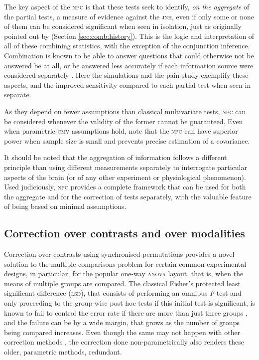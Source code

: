 The key aspect of the \textsc{npc} is that these tests seek to identify, \emph{on the aggregate} of the partial tests, a measure of evidence against the \textsc{jnh}, even if only some or none of them can be considered significant when seen in isolation, just as originally pointed out by \citet{Fisher1932} (Section \ref{sec:comb:history}). This is the logic and interpretation of all of these combining statistics, with the exception of the conjunction inference. Combination is known to be able to answer questions that could otherwise not be answered be at all, or be answered less accurately if each information source were considered separately \citep{Draper1992}. Here the simulations and the pain study exemplify these aspects, and the improved sensitivity compared to each partial test when seen in separate.

As they depend on fewer assumptions than classical multivariate tests, \textsc{npc} can be considered whenever the validity of the former cannot be guaranteed. Even when parametric \textsc{cmv} assumptions hold, note that the \textsc{npc} can have superior power when sample size is small and prevents precise estimation of a covariance.

It should be noted that the aggregation of information follows a different principle than using different measurements separately to interrogate particular aspects of the brain (or of any other experiment or physiological phenomenon). Used judiciously, \textsc{npc} provides a complete framework that can be used for both the aggregate and for the correction of tests separately, with the valuable feature of being based on minimal assumptions.

\subsection{Correction over contrasts and over modalities}

Correction over contrasts using synchronised permutations provides a novel solution to the multiple comparisons problem for certain common experimental designs, in particular, for the popular one-way \textsc{anova} layout, that is, when the means of multiple groups are compared. The classical Fisher's protected least significant difference (\textsc{lsd}), that consists of performing an omnibus $F$-test and only proceeding to the group-wise post hoc tests if this initial test is significant, is known to fail to control the error rate if there are more than just three groups \citep{Hayter1986, Hsu1996, Meier2006}, and the failure can be by a wide margin, that grows as the number of groups being compared increases. Even though the same may not happen with other correction methods \citep[e.g., Tukey's range test,][]{Tukey1949}, the correction done non-parametrically also renders these older, parametric methods, redundant.

